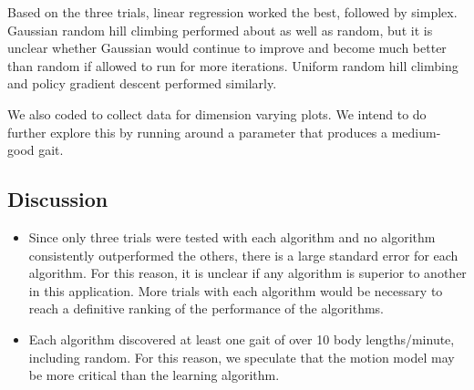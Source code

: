 Based on the three trials, linear regression worked the best, followed by simplex. Gaussian random hill climbing performed about as well as random, but it is unclear whether Gaussian would continue to improve and become much better than random if allowed to run for more iterations. Uniform random hill climbing and policy gradient descent performed similarly.

We also coded  to collect data for dimension
varying plots. We intend to do further explore this by running
 around a parameter that produces a medium-good gait.










\subsection{Discussion}


\begin{itemize}
\item  Since only three trials were tested with each algorithm and no algorithm consistently outperformed the others, there is a large standard error for each algorithm. For this reason, it is unclear if any algorithm is superior to another in this application. More trials with each algorithm would be necessary to reach a definitive ranking of the performance of the algorithms.

\item Each algorithm discovered at least one gait of over 10 body lengths/minute, including random. For this reason, we speculate that the motion model may be more critical than the learning algorithm.
\end{itemize}



